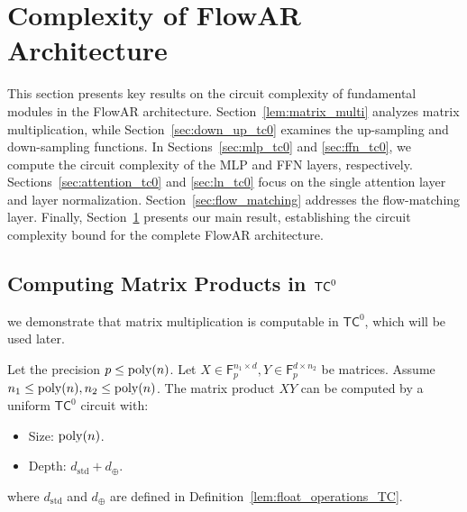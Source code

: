 \section{Complexity of FlowAR Architecture}\label{sec:main_result}
This section presents key results on the circuit complexity of fundamental modules in the FlowAR architecture. Section~\ref{lem:matrix_multi} analyzes matrix multiplication, while Section~\ref{sec:down_up_tc0} examines the up-sampling and down-sampling functions. In Sections~\ref{sec:mlp_tc0} and \ref{sec:ffn_tc0}, we compute the circuit complexity of the MLP and FFN layers, respectively. Sections~\ref{sec:attention_tc0} and \ref{sec:ln_tc0} focus on the single attention layer and layer normalization. Section~\ref{sec:flow_matching} addresses the flow-matching layer. Finally, Section~\ref{sec:main_result} presents our main result, establishing the circuit complexity bound for the complete FlowAR architecture.
\subsection{Computing Matrix Products in \texorpdfstring{$\mathsf{TC}^0$}{}}\label{sec:compute_matrix_product}
we demonstrate that matrix multiplication is computable in $\mathsf{TC}^0$, which will be used later.
\begin{lemma}\label{lem:matrix_multi}
    Let the precision $p \leq \operatorname{poly}(n)$. Let $X \in \mathsf{F}_p^{n_1 \times d}, Y \in \mathsf{F}_p^{d \times n_2}$ be matrices. Assume $n_1\leq\operatorname{poly}(n), n_2\leq\operatorname{poly}(n)$. The matrix product $XY$ can be computed by a uniform $\mathsf{TC}^0$ circuit with:
    \begin{itemize}
        \item Size: $\operatorname{poly}(n)$.
        \item Depth: $d_{\mathrm{std}}+d_{\oplus}$.
    \end{itemize}
    where $d_{\mathrm{std}}$ and $d_{\oplus}$ are defined in Definition~\ref{lem:float_operations_TC}.
\end{lemma}


